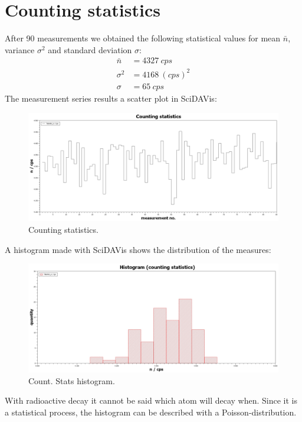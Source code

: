 \section{Counting statistics}
%
After 90 measurements we obtained the following statistical values for mean \( \bar{n} \), variance \( \sigma^{2} \) and standard deviation
\( \sigma \):
%
\begin{align}
\bar{n}     &=  \SI{4327}{cps} \\
\sigma^{2}  &=  \SI{4168}{(cps)^{2}} \\
\sigma      &=  \SI{65}{cps}
\end{align}
The measurement series results a scatter plot in SciDAVis:
\begin{figure}[H]
 \centering
 \includegraphics[width=.8\textwidth]{scidavis/Fig.8_Counting statistics.jpg}
 \caption[Counting statistics]{Counting statistics.}
 \label{fig:countingStatistics}
\end{figure}
A histogram made with SciDAVis shows the distribution of the measures:
\begin{figure}[H]
 \centering
 \includegraphics[width=.8\textwidth]{scidavis/Fig.9_Histogram (counting statistics).jpg}
 \caption[Count. stats histogram]{Count. Stats histogram.}
 \label{fig:countStatsHistogram}
\end{figure}
With radioactive decay it cannot be said which atom will decay when. Since it is a statistical process, the histogram
can be described with a Poisson-distribution.
%
